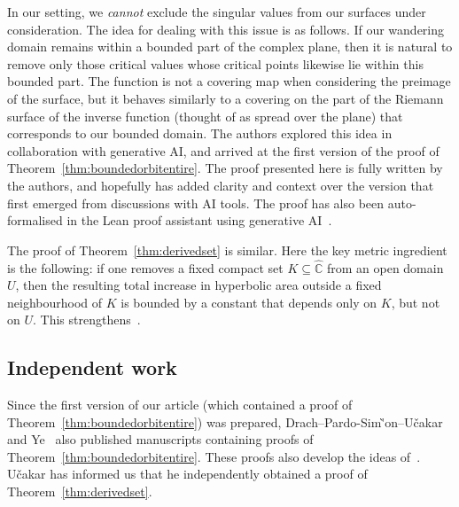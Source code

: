 \documentclass[12pt,a4paper,reqno]{amsart}
\theoremstyle{plain}
\renewcommand{\subset}{\subseteq}
\theoremstyle{definition}
\theoremstyle{remark}
\numberwithin{equation}{section}
\newcommand \Ch{\widehat{\mathbb{C}}}
\newcommand{\lr}[1]{{\color{magenta} #1}}
\begin{document}
 In our setting, we \emph{cannot} exclude the 
 singular values from our surfaces under consideration. The idea
 for dealing with this issue is as follows. If our
 wandering domain remains within a bounded part of the complex plane, then it is natural 
 to remove only those critical values whose critical points likewise lie within this
 bounded part. The function is not a covering map when considering the preimage of the surface,
 but it behaves similarly to a covering on the part of the Riemann surface of the inverse function
 (thought of as spread over the plane) that corresponds to our bounded domain. The authors
 explored this idea in collaboration with generative AI, and
 arrived at the first version of the proof of Theorem~\ref{thm:boundedorbitentire}. The proof
 presented here is fully written by the authors,
 and hopefully has added clarity and context
 over the version that first emerged from
 discussions with AI tools. The proof has
 also been auto-formalised in the Lean 
 proof assistant using generative AI~\cite{PRW2026formalisation}.

\lr{The proof of Theorem~\ref{thm:derivedset} is similar. Here the key metric ingredient is the
 following: if one removes a fixed compact set $K\subset\Ch$ from an open domain $U$, then 
 the resulting total increase in hyperbolic area outside a fixed neighbourhood of $K$ is 
 bounded by a constant that depends only on $K$, but not on $U$. This 
 strengthens~\cite[Lemma~2.4]{ye26}.}

 \subsection*{Independent work}
 \lr{Since the first version of our article (which contained a proof of Theorem~\ref{thm:boundedorbitentire}) was prepared, Drach--Pardo-Sim\`'on--U\v{c}akar~\cite{drach-pardo-ucakar} and Ye~\cite{ye26-2} also published manuscripts
 containing proofs of Theorem~\ref{thm:boundedorbitentire}. These proofs also develop
 the ideas of~\cite{ye26}. U\v{c}akar has informed us that he independently obtained
 a proof of Theorem~\ref{thm:derivedset}.}

 
\end{document}

